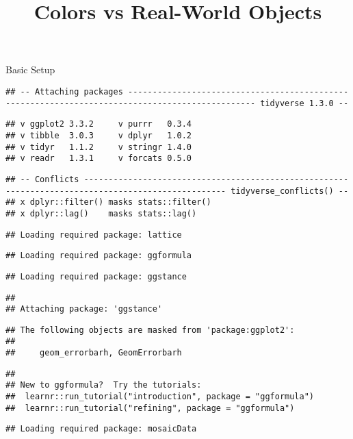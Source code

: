 \documentclass[
]{article}
\title{Colors vs Real-World Objects}
\author{}
\date{\vspace{-2.5em}}
\begin{document}
\maketitle

Basic Setup

\begin{verbatim}
## -- Attaching packages ------------------------------------------------------------------------------------------------ tidyverse 1.3.0 --
\end{verbatim}

\begin{verbatim}
## v ggplot2 3.3.2     v purrr   0.3.4
## v tibble  3.0.3     v dplyr   1.0.2
## v tidyr   1.1.2     v stringr 1.4.0
## v readr   1.3.1     v forcats 0.5.0
\end{verbatim}

\begin{verbatim}
## -- Conflicts --------------------------------------------------------------------------------------------------- tidyverse_conflicts() --
## x dplyr::filter() masks stats::filter()
## x dplyr::lag()    masks stats::lag()
\end{verbatim}

\begin{verbatim}
## Loading required package: lattice
\end{verbatim}

\begin{verbatim}
## Loading required package: ggformula
\end{verbatim}

\begin{verbatim}
## Loading required package: ggstance
\end{verbatim}

\begin{verbatim}
## 
## Attaching package: 'ggstance'
\end{verbatim}

\begin{verbatim}
## The following objects are masked from 'package:ggplot2':
## 
##     geom_errorbarh, GeomErrorbarh
\end{verbatim}

\begin{verbatim}
## 
## New to ggformula?  Try the tutorials: 
##  learnr::run_tutorial("introduction", package = "ggformula")
##  learnr::run_tutorial("refining", package = "ggformula")
\end{verbatim}

\begin{verbatim}
## Loading required package: mosaicData
\end{verbatim}
\end{document}
